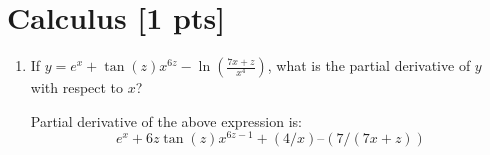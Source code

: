 \documentclass[a4paper]{article}
\theoremstyle{definition}
\newenvironment{soln}{
    \leavevmode\color{blue}\ignorespaces
}{}
\begin{document}
\section{Calculus [1 pts]}
\begin{enumerate}
	\item If $y = e^x + \tan(z)x^{6z} - \ln(\frac{7x + z}{x^{4}})$, what is the partial derivative of $y$ with respect to $x$?\\
	\begin{soln}  

		Partial derivative of the above expression is:  
		$$
		e^x + 6z\tan(z)x^{6z-1} + (4/x) – (7/(7x+z))
 		$$

	\end{soln}

\end{enumerate}
\end{document}
